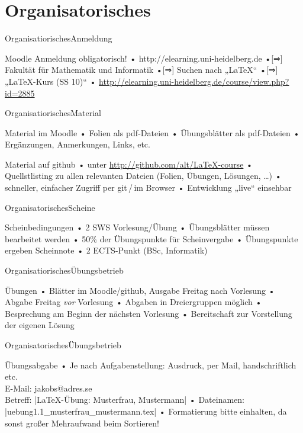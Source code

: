 


\section{Organisatorisches}
\begin{frame}{Organisatiorisches}{Anmeldung}
\begin{block}{Moodle}
Anmeldung obligatorisch!
• http://elearning.uni-heidelberg.de
•[⇒] Fakultät für Mathematik und Informatik
•[⇒] Suchen nach „LaTeX“
•[⇒] „LaTeX-Kurs (SS 10)“
• \url{http://elearning.uni-heidelberg.de/course/view.php?id=2885}
\•
\end{block}
\end{frame}

\begin{frame}{Organisatiorisches}{Material}
\begin{block}{Material im Moodle}
• Folien als pdf-Dateien
• Übungsblätter als pdf-Dateien
• Ergänzungen, Anmerkungen, Links, etc.
\•
\end{block}
\begin{block}{Material auf github}
• unter \url{http://github.com/alt/LaTeX-course}
• Quellstlisting zu allen relevanten Dateien (Folien, Übungen, Lösungen, …)
• schneller, einfacher Zugriff per git\,/\,im Browser
• Entwicklung „live“ einsehbar
\•
\end{block}
\end{frame}

\begin{frame}{Organisatorisches}{Scheine}
\begin{block}{Scheinbedingungen}
• 2 SWS Vorlesung/Übung
• Übungsblätter müssen bearbeitet werden
• 50\% der Übungspunkte für Scheinvergabe
• Übungspunkte ergeben Scheinnote
• 2 ECTS-Punkt (BSc, Informatik)
\•
\end{block}
\end{frame}

\begin{frame}{Organisatiorisches}{Übungsbetrieb}
\begin{block}{Übungen}
• Blätter im Moodle/github, Ausgabe Freitag nach Vorlesung
• Abgabe Freitag \emph{vor} Vorlesung
• Abgaben in Dreiergruppen möglich
• Besprechung am Beginn der nächsten Vorlesung
• Bereitschaft zur Vorstellung der eigenen Lösung
\•
\end{block}
\end{frame}

\begin{frame}[fragile]{Organisatorisches}{Übungsbetrieb}
\begin{block}{Übungsabgabe}
• Je nach Aufgabenstellung: Ausdruck, per Mail, handschriftlich etc.%
\\ E-Mail: jakobs@adres.se\\%
Betreff: |LaTeX-Übung: Musterfrau, Mustermann|
• Dateinamen: |uebung1.1_musterfrau_mustermann.tex|
• Formatierung bitte einhalten, da sonst großer Mehraufwand beim Sortieren!
\•
\end{block}
\end{frame}

